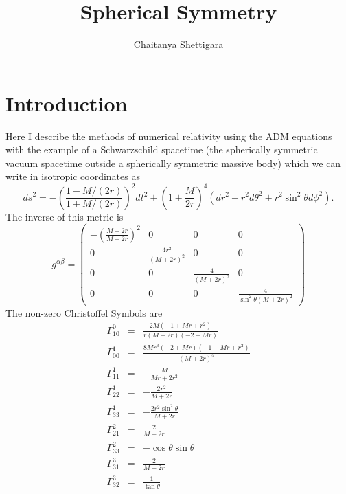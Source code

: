 \documentclass{article}
\begin{document}
\title{Spherical Symmetry}\author{Chaitanya Shettigara}\maketitle

\section{Introduction}
Here I describe the methods of numerical relativity using the ADM equations with the example of a Schwarzschild spacetime (the spherically symmetric vacuum spacetime outside a spherically symmetric massive body) which we can write in isotropic coordinates as
\begin{equation}
 ds^2 = - \left( \frac{1 - M / \left( 2 r \right)}{1 + M /
   \left( 2 r \right)} \right)^2 dt^2 +\left(1+\frac{M}{2r}\right)^4(dr^2+r^2d\theta^2+r^2\sin^2\theta d\phi^2 ) .
   \end{equation}\label{Iso4Metric}
The inverse of this metric is 
\begin{equation}
g^{\alpha \beta}=\left( \begin{array}{cccc}
-\left(\frac{M+2r}{M-2r}\right)^2 & 0 & 0 & 0 \\
0 & \frac{4r^2}{(M+2r)^2} & 0 & 0 \\
0 & 0 & \frac{4}{(M+2r)^2} & 0 \\
0 & 0 & 0 & \frac{4}{\sin^2 \theta (M+2r)^2}
\end{array} \right)
\end{equation}
The non-zero Christoffel Symbols are
\begin{equation} \begin{array}{ccl}
\Gamma^0_{10} &=& \frac{2M(-1+Mr+r^2)}{r(M+2r)(-2+Mr)}\\
\Gamma^1_{00} &=& \frac{8Mr^3(-2+Mr)(-1+Mr+r^2)}{(M+2r)^5}\\
\Gamma^1_{11} &=& -\frac{M}{Mr+2r^2}\\
\Gamma^1_{22} &=& -\frac{2r^2}{M+2r}\\
\Gamma^1_{33} &=& -\frac{2r^2\sin^2 \theta}{M+2r} \\
\Gamma^2_{21} &=& \frac{2}{M+2r} \\
\Gamma^2_{33} &=& -\cos \theta \sin \theta \\
\Gamma^3_{31} &=& \frac{2}{M+2r} \\
\Gamma^3_{32} &=& \frac{1}{\tan\theta}
\end{array} 
\end{equation}
\end{document}
